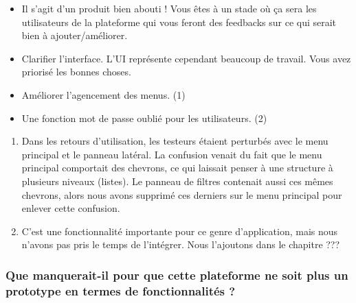 \begin{itemize}
    \item Il s'agit d'un produit bien abouti ! Vous êtes à un stade où ça sera les utilisateurs de la plateforme qui vous feront des feedbacks sur ce qui serait bien à ajouter/améliorer.
    \item Clarifier l'interface. L'UI représente cependant beaucoup de travail. Vous avez priorisé les bonnes choses.
    \item Améliorer l'agencement des menus. (1)
    \item Une fonction mot de passe oublié pour les utilisateurs. (2)
\end{itemize}
\bigskip
\begin{enumerate}
    \item Dans les retours d'utilisation, les testeurs étaient perturbés avec le menu principal et le panneau latéral. La confusion venait du fait que le menu principal comportait des chevrons, ce qui laissait penser à une structure à plusieurs niveaux (listes). Le panneau de filtres contenait aussi ces mêmes chevrons, alors nous avons supprimé ces derniers sur le menu principal pour enlever cette confusion.
    \item C'est une fonctionnalité importante pour ce genre d'application, mais nous n'avons pas pris le temps de l'intégrer. Nous l'ajoutons dans le chapitre ???
\end{enumerate}

\subsubsection*{Que manquerait-il pour que cette plateforme ne soit plus un prototype en termes de fonctionnalités ?}

